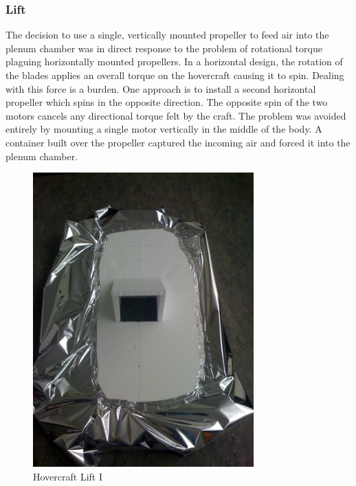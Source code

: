 \subsubsection{Lift}
The decision to use a single, vertically mounted propeller to feed air into the plenum chamber was in direct response to the problem of rotational torque plaguing horizontally mounted propellers. In a horizontal design, the rotation of the blades applies an overall torque on the hovercraft causing it to spin. Dealing with this force is a burden. One approach is to install a second horizontal propeller which spins in the opposite direction. The opposite spin of the two motors cancels any directional torque felt by the craft. The problem was avoided entirely by mounting a single motor vertically in the middle of the body. A container built over the propeller captured the incoming air and forced it into the plenum chamber.

\begin{figure}[h]
  \begin{center}
    \includegraphics[width=85mm]{imageSources/lift1.png}
  \end{center}
  \caption{Hovercraft Lift I} 
  \label{lif1}
\end{figure}

